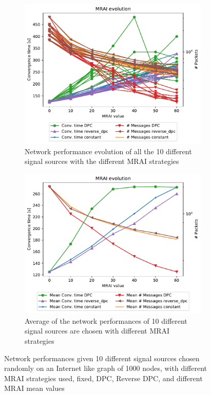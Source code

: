 \begin{figure}[h]
     \centering
     \begin{subfigure}[b]{0.45\textwidth}
         \centering
         \includegraphics[width=\textwidth]{images/position/different_destinations-1000_all.pdf}
		 \caption{Network performance evolution of all the \num{10} different signal sources 
			with the different \ac{MRAI} strategies}
         \label{fig:different_destinations_all}
     \end{subfigure}
     \hfill
     \begin{subfigure}[b]{0.45\textwidth}
         \centering
         \includegraphics[width=\textwidth]{images/position/different_destinations-1000_mean.pdf}
		 \caption{Average of the network performances of \num{10} different 
			signal sources are chosen with different \ac{MRAI} strategies}
         \label{fig:different_destinations_mean}
     \end{subfigure}
	 \caption{Network performances given \num{10} different signal sources chosen
		randomly on an Internet like graph of \num{1000} nodes, with different
		\ac{MRAI} strategies used, fixed, \ac{DPC}, Reverse \ac{DPC}, and 
		different \ac{MRAI} mean values}
	 \label{fig:different_destinations}
\end{figure}

